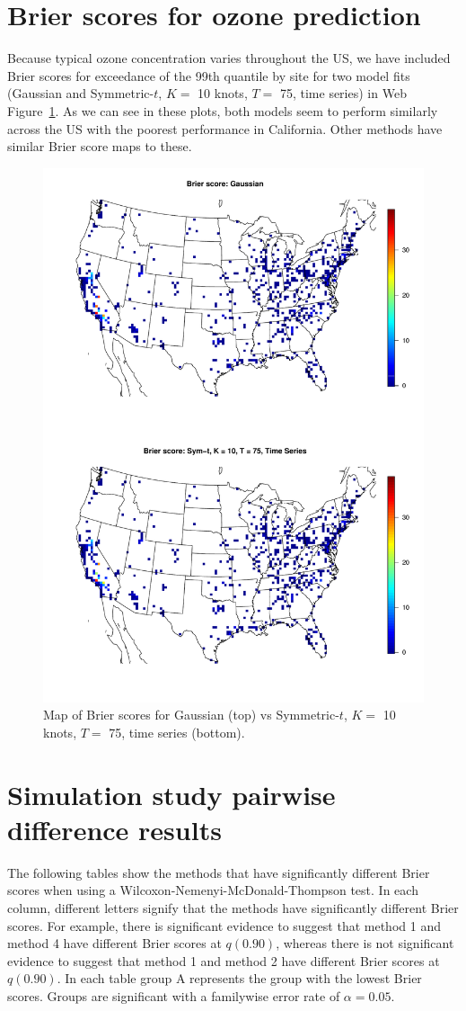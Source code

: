 \documentclass[useAMS,usenatbib,referee]{biomweb}
\renewcommand{\fref}[1]{Web Figure~\ref{#1}}
\begin{document}
\section{Brier scores for ozone prediction} \label{sta:ozonesite}
Because typical ozone concentration varies throughout the US, we have included Brier scores for exceedance of the 99th quantile by site for two model fits (Gaussian and Symmetric-$t$, $K = $ 10 knots, $T = $ 75, time series) in \fref{stfig:bssite}.
As we can see in these plots, both models seem to perform similarly across the US with the poorest performance in California.
Other methods have similar Brier score maps to these.
\begin{figure}
  \centering
  \includegraphics[width=0.8\linewidth]{plots/bs-site}
  \caption{Map of Brier scores for Gaussian (top) vs Symmetric-$t$, $K = $ 10 knots, $T = $ 75, time series (bottom).}
  \label{stfig:bssite}
\end{figure}

\section{Simulation study pairwise difference results} \label{sta:pdiffs}
The following tables show the methods that have significantly different Brier scores when using a Wilcoxon-Nemenyi-McDonald-Thompson test.
In each column, different letters signify that the methods have significantly different Brier scores.
For example, there is significant evidence to suggest that method 1 and method 4 have different Brier scores at $q(0.90)$, whereas there is not significant evidence to suggest that method 1 and method 2 have different Brier scores at $q(0.90)$.
In each table group A represents the group with the lowest Brier scores.
Groups are significant with a familywise error rate of $\alpha = 0.05$.
\end{document}
